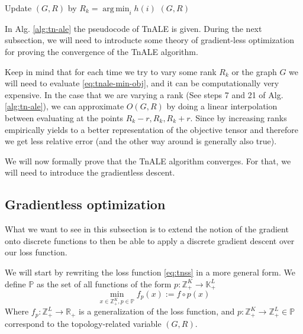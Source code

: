 \documentclass[11pt,a4paper,openright,oneside]{book}
\numberwithin{equation}{section}
\DeclareMathOperator*{\argmin}{arg\,min}
\begin{document}
{\begin{algorithm}[h]
\begin{algorithmic}[1]
                \EndFor
                \State Update $(G, R)$ by $R_k = \argmin_i h(i)$
            \EndFor
        \EndFor
        \State \Return $(G, R)$

    \end{algorithmic}

    \label{alg:tn-ale}
\end{algorithm}

In Alg. \ref{alg:tn-ale} the pseudocode of \gls{TnALE} is given. During the next subsection, we will need to introducte some theory of
gradient-less optimization for proving the convergence of the \gls{TnALE} algorithm.

Keep in mind that for each time we try to vary some rank $R_k$ or the graph $G$ we will need to evaluate \eqref{eq:tnale-min-obj}, and it 
can be computationally very expensive. In the case that we are varying a rank (See steps 7 and 21 of Alg. \ref{alg:tn-ale}), we can 
approximate $O(G, R)$ by doing a linear interpolation between evaluating at the points
$R_k - r, R_k, R_k + r$. Since by increasing ranks empirically yields 
to a better representation of the objective tensor \cite{liAlternatingLocalEnumeration2023} and therefore we get less relative error
(and the other way around is generally also true).

We will now formally prove that the \gls{TnALE} algorithm converges. For that, we will need to introduce the gradientless descent.

\subsection{Gradientless optimization}

What we want to see in this subsection is to extend the notion of the gradient onto 
discrete functions to then be able to apply a discrete gradient descent over our loss function.

We will start by rewriting the loss function \eqref{eq:tnss} in a more general form. We define $\mathbb{P}$ as the
set of all functions of the form $p : \mathbb{Z}_+^K \rightarrow \mathbb{K}_+^L$
\begin{equation}
\min_{x \in \mathbb{Z}_+^K, p \in \mathbb{P}} f_p(x) := f \circ p(x)
\label{eq:min_grad}
\end{equation}
Where $f_p : \mathbb{Z}_+^L \rightarrow \mathbb{R}_+$ is a generalization of the loss function, and $p : \mathbb{Z}_+^K \rightarrow \mathbb{Z}_+^L \in \mathbb{P}$
correspond to the topology-related variable $(G, R)$.

}
\end{document}
